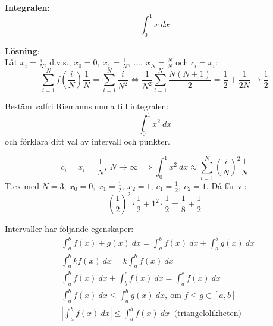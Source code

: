 \documentclass{report}
\begin{document}
\pagebreak
{}
{
}

{
}


{
\textbf{Integralen}:
\begin{equation*}
\int_{0}^{1} x \: dx 
\end{equation*}

\textbf{Lösning}:\\
Låt $ x_i = \frac{i}{N}  $, d.v.s., $ x_0 = 0,\: x_1 = \frac{1}{N}, \: \ldots, \: x_N = \frac{N}{N} $ och $ c_i = x_i $:
\begin{equation*}
\sum_{i=1}^{N} f( \frac{i}{N} ) \frac{1}{N} = \sum_{i = 1}^{N} \frac{i}{N^2} \iff \frac{1}{N^2} \sum_{i=1}^{N} \frac{N(N+1)}{2} = \frac{1}{2} + \frac{1}{2N} \to \frac{1}{2}  
\end{equation*}
}

\qs{}
{
Bestäm valfri Riemannsumma till integralen:
\begin{equation*}
\int_{0}^{1} x^2 \: dx 
\end{equation*}
och förklara ditt val av intervall och punkter.
}

\sol 
\begin{equation*}
c_i = x_i = \frac{1}{N},\: N \to \infty \implies \int_{0}^{1} x^2 \: dx \approx \sum_{i=1}^{N} ( \frac{i}{N} )^2  \frac{1}{N}  
\end{equation*}
T.ex med $ N=3,\: x_0 = 0,\:x_1 = \frac{1}{2},\: x_2 = 1,\: c_1 = \frac{1}{2},\:c_2 = 1 $. Då får vi:
\begin{equation*}
	( \frac{1}{2} )^2 \cdot \frac{1}{2} + 1^2 \cdot \frac{1}{2}  = \frac{1}{8} + \frac{1}{2} 
\end{equation*} 

\noindent
Intervaller har följande egenskaper:
\begin{align*}
	&\int_{a}^{b} f(x)+g(x) \: dx = \int_{a}^{b} f(x) \: dx + \int_{a}^{b} g(x) \: dx\\
	&\int_{a}^{b} kf(x) \: dx = k \int_{a}^{b} f(x) \: dx\\
	&\int_{a}^{b} f(x) \: dx + \int_{b}^{c} f(x) \: dx = \int_{a}^{c} f(x) \: dx\\
	&\int_{a}^{b} f(x) \: dx \le \int_{a}^{b} g(x) \: dx,\: \text{om } f \le g \in [a,b]\\
	&|\int_{a}^{b} f(x) \: dx| \le \int_{a}^{b} f(x) \: dx\: \text{ (triangelolikheten)}   
\end{align*}
\end{document}

